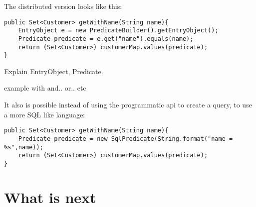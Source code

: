 The distributed version looks like this:

\begin{verbatim}
public Set<Customer> getWithName(String name){
    EntryObject e = new PredicateBuilder().getEntryObject();
    Predicate predicate = e.get("name").equals(name);
    return (Set<Customer>) customerMap.values(predicate);
}
\end{verbatim}

Explain EntryObject, Predicate.

example with and.. or.. etc

It also is possible instead of using the programmatic api to create a query, to use a more SQL like language:

\begin{verbatim}
public Set<Customer> getWithName(String name){
    Predicate predicate = new SqlPredicate(String.format("name = %s",name));
    return (Set<Customer>) customerMap.values(predicate);
}
\end{verbatim}

\section{What is next}